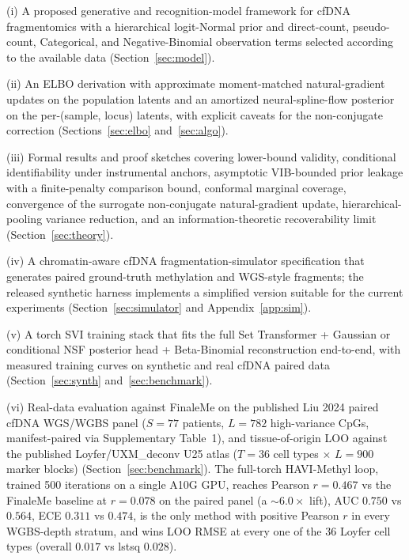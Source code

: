 \noindent (i) A proposed generative and recognition-model framework for cfDNA fragmentomics with a hierarchical logit-Normal prior and direct-count, pseudo-count, Categorical, and Negative-Binomial observation terms selected according to the available data (Section~\ref{sec:model}).

\noindent (ii) An ELBO derivation with approximate moment-matched natural-gradient updates on the population latents and an amortized neural-spline-flow posterior on the per-(sample, locus) latents, with explicit caveats for the non-conjugate correction (Sections~\ref{sec:elbo} and~\ref{sec:algo}).

\noindent (iii) Formal results and proof sketches covering lower-bound validity, conditional identifiability under instrumental anchors, asymptotic VIB-bounded prior leakage with a finite-penalty comparison bound, conformal marginal coverage, convergence of the surrogate non-conjugate natural-gradient update, hierarchical-pooling variance reduction, and an information-theoretic recoverability limit (Section~\ref{sec:theory}).

\noindent (iv) A chromatin-aware cfDNA fragmentation-simulator specification that generates paired ground-truth methylation and WGS-style fragments; the released synthetic harness implements a simplified version suitable for the current experiments (Section~\ref{sec:simulator} and Appendix~\ref{app:sim}).

\noindent (v) A torch SVI training stack that fits the full Set Transformer + Gaussian or conditional NSF posterior head + Beta-Binomial reconstruction end-to-end, with measured training curves on synthetic and real cfDNA paired data (Section~\ref{sec:synth} and~\ref{sec:benchmark}).

\noindent (vi) Real-data evaluation against FinaleMe on the published Liu 2024 paired cfDNA WGS/WGBS panel ($S=77$ patients, $L=782$ high-variance CpGs, manifest-paired via Supplementary Table~1), and tissue-of-origin LOO against the published Loyfer/UXM\_deconv U25 atlas ($T=36$ cell types $\times$ $L=900$ marker blocks) (Section~\ref{sec:benchmark}). The full-torch HAVI-Methyl loop, trained 500 iterations on a single A10G GPU, reaches Pearson $r=0.467$ vs the FinaleMe baseline at $r=0.078$ on the paired panel (a $\sim 6.0\times$ lift), AUC $0.750$ vs $0.564$, ECE $0.311$ vs $0.474$, is the only method with positive Pearson $r$ in every WGBS-depth stratum, and wins LOO RMSE at every one of the 36 Loyfer cell types (overall $0.017$ vs lstsq $0.028$).

